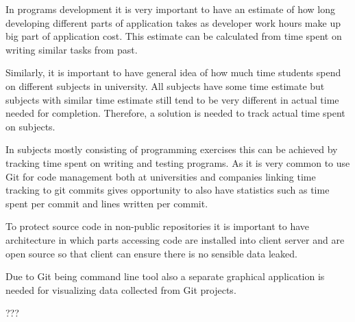 In programs development it is very important to have an estimate of how long developing different parts of application takes as
developer work hours make up big part of application cost.
This estimate can be calculated from time spent on writing similar tasks from past.

Similarly, it is important to have general idea of how much time students spend on different subjects in university.
All subjects have some time estimate but subjects with similar time estimate still tend to be very different in actual
time needed for completion.
Therefore, a solution is needed to track actual time spent on subjects.

In subjects mostly consisting of programming exercises this can be achieved by tracking time spent on writing and testing programs.
As it is very common to use Git for code management both at universities and companies linking time tracking to git commits
gives opportunity to also have statistics such as time spent per commit and lines written per commit.

To protect source code in non-public repositories it is important to have architecture in which parts accessing code are
installed into client server and are open source so that client can ensure there is no sensible data leaked.

Due to Git being command line tool also a separate graphical application is needed for visualizing data collected
from Git projects.

???